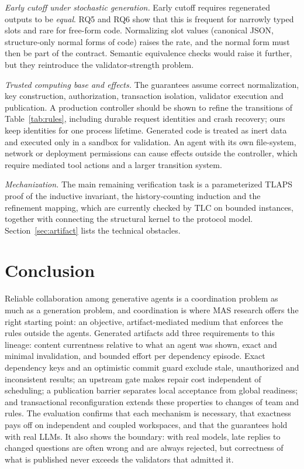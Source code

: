 \emph{Early cutoff under stochastic generation.} Early cutoff requires regenerated outputs to be \emph{equal}. RQ5 and RQ6 show that this is frequent for narrowly typed slots and rare for free-form code. Normalizing slot values (canonical JSON, structure-only normal forms of code) raises the rate, and the normal form must then be part of the contract. Semantic equivalence checks would raise it further, but they reintroduce the validator-strength problem.

\emph{Trusted computing base and effects.} The guarantees assume correct normalization, key construction, authorization, transaction isolation, validator execution and publication. A production controller should be shown to refine the transitions of Table~\ref{tab:rules}, including durable request identities and crash recovery; ours keep identities for one process lifetime. Generated code is treated as inert data and executed only in a sandbox for validation. An agent with its own file-system, network or deployment permissions can cause effects outside the controller, which require mediated tool actions and a larger transition system.

\emph{Mechanization.} The main remaining verification task is a parameterized TLAPS proof of the inductive invariant, the history-counting induction and the refinement mapping, which are currently checked by TLC on bounded instances, together with connecting the structural kernel to the protocol model. Section~\ref{sec:artifact} lists the technical obstacles.

\section{Conclusion}\label{sec:conclusion}
Reliable collaboration among generative agents is a coordination problem as much as a generation problem, and coordination is where MAS research offers the right starting point: an objective, artifact-mediated medium that enforces the rules outside the agents. Generated artifacts add three requirements to this lineage: content currentness relative to what an agent was shown, exact and minimal invalidation, and bounded effort per dependency episode. Exact dependency keys and an optimistic commit guard exclude stale, unauthorized and inconsistent results; an upstream gate makes repair cost independent of scheduling; a publication barrier separates local acceptance from global readiness; and transactional reconfiguration extends these properties to changes of team and rules. The evaluation confirms that each mechanism is necessary, that exactness pays off on independent and coupled workspaces, and that the guarantees hold with real LLMs. It also shows the boundary: with real models, late replies to changed questions are often wrong and are always rejected, but correctness of what is published never exceeds the validators that admitted it.
